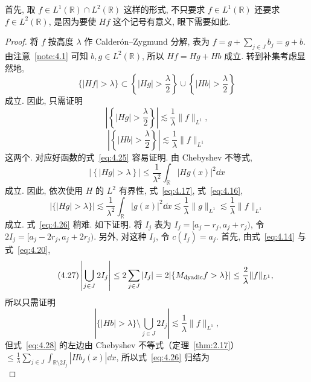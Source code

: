 首先, 取 $f \in L^{1}(\mathbb{R}) \cap L^{2}(\mathbb{R})$ 这样的形式, 不只要求 $f \in L^{1}(\mathbb{R})$ 还要求 $f \in L^{2}(\mathbb{R})$, 是因为要使 $Hf$ 这个记号有意义, 眼下需要如此.

\begin{proof}
将 $f$ 按高度 $\lambda$ 作 Calderón--Zygmund 分解, 表为 $f = g + \sum_{j \in J}b_{j} = g + b$. 由注意~\ref{note:4.1} 可知 $b, g \in L^{2}(\mathbb{R})$, 所以 $Hf = Hg + Hb$ 成立. 转到补集考虑显然地,
\begin{equation}\tag{4.24}
\{|Hf| > \lambda\} \subset \left\{|Hg| > \frac{\lambda}{2}\right\} \cup \left\{|Hb| > \frac{\lambda}{2}\right\}
\label{eq:4.24}
\end{equation}
成立. 因此, 只需证明
\begin{equation}\tag{4.25}
\left|\left\{|Hg| > \frac{\lambda}{2}\right\}\right| \lesssim \frac{1}{\lambda}\|f\|_{L^{1}},
\label{eq:4.25}
\end{equation}
\begin{equation}\tag{4.26}
\left|\left\{|Hb| > \frac{\lambda}{2}\right\}\right| \lesssim \frac{1}{\lambda}\|f\|_{L^{1}}
\label{eq:4.26}
\end{equation}
这两个. 对应好函数的式~\eqref{eq:4.25} 容易证明. 由 Chebyshev 不等式,
\[
\left|\left\{|Hg| > \lambda\right\}\right| \leq \frac{1}{\lambda^{2}}\int_{\mathbb{R}}|Hg(x)|^{2}\dd x
\]
成立. 因此, 依次使用 $H$ 的 $L^{2}$ 有界性, 式~\eqref{eq:4.17}, 式~\eqref{eq:4.16},
\[
|\{|Hg| > \lambda\}| \lesssim \frac{1}{\lambda^{2}}\int_{\mathbb{R}}|g(x)|^{2}\dd x \lesssim \frac{1}{\lambda}\|g\|_{L^{1}} \lesssim \frac{1}{\lambda}\|f\|_{L^{1}}
\]
成立. 式~\eqref{eq:4.26} 稍难. 如下证明. 将 $I_{j}$ 表为 $I_{j} = [a_{j}-r_{j}, a_{j}+r_{j})$, 令 $2I_{j} = [a_{j}-2r_{j}, a_{j}+2r_{j})$. 另外, 对这种 $I_{j}$, 令 $c(I_{j}) = a_{j}$. 首先, 由式~\eqref{eq:4.14} 与式~\eqref{eq:4.20},
\begin{equation}\tag{4.27}
\left|\bigcup_{j \in J}2I_{j}\right| \leq 2\sum_{j \in J}|I_{j}| = 2|\{M_{\mathrm{dyadic}}f > \lambda\}| \leq \frac{2}{\lambda}\|f\|_{L^{1}},
\label{eq:4.27}
\end{equation}
所以只需证明
\begin{equation}\tag{4.28}
\left|\{|Hb| > \lambda\} \setminus \bigcup_{j \in J}2I_{j}\right| \lesssim \frac{1}{\lambda}\|f\|_{L^{1}},
\label{eq:4.28}
\end{equation}
但式~\eqref{eq:4.28} 的左边由 Chebyshev 不等式（定理~\ref{thm:2.17}）$\leq \frac{1}{\lambda}\sum_{j \in J}\int_{\mathbb{R}\setminus 2I_{j}}|Hb_{j}(x)|\dd x$, 所以式~\eqref{eq:4.26} 归结为
\begin{equation}\tag{4.29}

\end{equation}
\end{proof}
